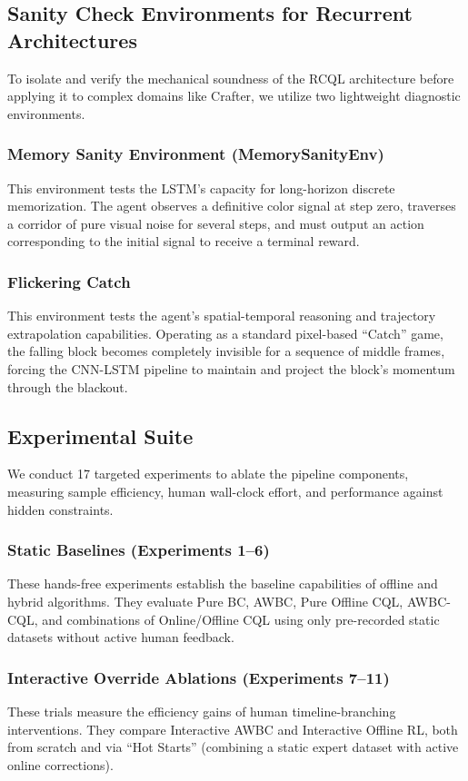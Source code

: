 \documentclass{article}
\begin{document}
\subsection{Sanity Check Environments for Recurrent Architectures}
To isolate and verify the mechanical soundness of the RCQL architecture before applying it to complex domains like Crafter, we utilize two lightweight diagnostic environments.

\subsubsection{Memory Sanity Environment (MemorySanityEnv)}
This environment tests the LSTM's capacity for long-horizon discrete memorization. The agent observes a definitive color signal at step zero, traverses a corridor of pure visual noise for several steps, and must output an action corresponding to the initial signal to receive a terminal reward.

\subsubsection{Flickering Catch}
This environment tests the agent's spatial-temporal reasoning and trajectory extrapolation capabilities. Operating as a standard pixel-based ``Catch'' game, the falling block becomes completely invisible for a sequence of middle frames, forcing the CNN-LSTM pipeline to maintain and project the block's momentum through the blackout.

\subsection{Experimental Suite}
We conduct 17 targeted experiments to ablate the pipeline components, measuring sample efficiency, human wall-clock effort, and performance against hidden constraints. 

\subsubsection{Static Baselines (Experiments 1--6)}
These hands-free experiments establish the baseline capabilities of offline and hybrid algorithms. They evaluate Pure BC, AWBC, Pure Offline CQL, AWBC-CQL, and combinations of Online/Offline CQL using only pre-recorded static datasets without active human feedback.

\subsubsection{Interactive Override Ablations (Experiments 7--11)}
These trials measure the efficiency gains of human timeline-branching interventions. They compare Interactive AWBC and Interactive Offline RL, both from scratch and via ``Hot Starts'' (combining a static expert dataset with active online corrections).
\end{document}
